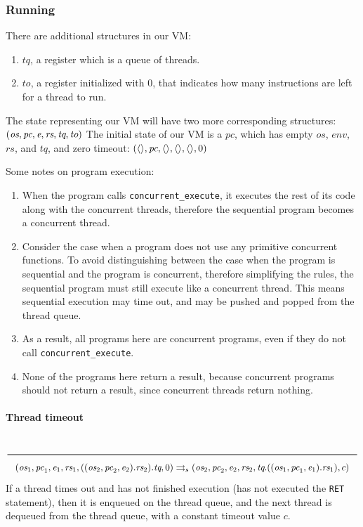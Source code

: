 \subsubsection{Running}
\label{sec:orgd7da3c4}
There are additional structures in our VM:
\begin{enumerate}
\item \(\textit{tq}\), a register which is a queue of threads.
\item \(\textit{to}\), a register initialized with \(0\), that indicates how many instructions are left for a thread to run.
\end{enumerate}
The state representing our VM will have two more corresponding structures:
\((\textit{os}, \textit{pc}, \textit{e}, \textit{rs}, \textit{tq}, \textit{to})\\\)
The initial state of our VM is a \(\textit{pc}\), which has empty \(\textit{os}\), \(\textit{env}\), \(\textit{rs}\), and \(\textit{tq}\), and zero timeout:
\((\langle \rangle, \textit{pc}, \langle \rangle, \langle \rangle, \langle \rangle, 0)\\\)

Some notes on program execution:
\begin{enumerate}
\item When the program calls \texttt{concurrent\_execute}, it executes the rest of its code along with the concurrent threads, therefore the sequential program becomes a concurrent thread.
\item Consider the case when a program does not use any primitive concurrent functions. To avoid distinguishing between the case when the program is sequential and the program is concurrent, therefore simplifying the rules, the sequential program must still execute like a concurrent thread. This means sequential execution may time out, and may be pushed and popped from the thread queue.
\item As a result, all programs here are concurrent programs, even if they do not call \texttt{concurrent\_execute}.
\item None of the programs here return a result, because concurrent programs should not return a result, since concurrent threads return nothing.
\end{enumerate}

\paragraph{Thread timeout}
\label{sec:org3f93610}
\(\\\Rule{}{(\textit{os}_1, \textit{pc}_1, \textit{e}_1, \textit{rs}_1, ((\textit{os}_2, \textit{pc}_2, \textit{e}_2).\textit{rs}_2).\textit{tq}, 0) \transition (\textit{os}_2, \textit{pc}_2, \textit{e}_2, \textit{rs}_2, \textit{tq}.((\textit{os}_1, \textit{pc}_1, \textit{e}_1).\textit{rs}_1), c)}\\\)
If a thread times out and has not finished execution (has not executed the \texttt{RET} statement), then it is enqueued on the thread queue, and the next thread is dequeued from the thread queue, with a constant timeout value \(c\).

